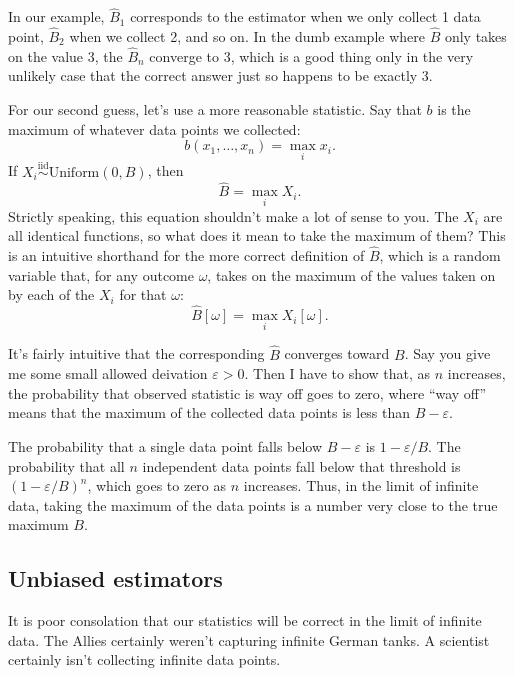 In our example, $\hat{B}_1$ corresponds to the estimator when we only collect
1 data point, $\hat{B}_2$ when we collect 2, and so on. In the dumb example
where $\hat{B}$ only takes on the value 3, the $\hat{B}_n$ converge to 3, which
is a good thing only in the very unlikely case that the correct answer just so
happens to be exactly 3.

For our second guess, let's use a more reasonable statistic. Say that $b$
is the maximum of whatever data points we collected:
\begin{equation*}
    b(x_1, \ldots, x_n) = \max_i x_i.
\end{equation*}
If $X_i \stackrel{\text{iid}}{\sim} \text{Uniform}(0, B)$, then
\begin{equation*}
    \hat{B} = \max_i X_i.
\end{equation*}
Strictly speaking, this equation shouldn't make a lot of sense to you. The $X_i$
are all identical functions, so what does it mean to take the maximum of them?
This is an intuitive shorthand for the more correct definition of $\hat{B}$,
which is a random variable that, for any outcome $\omega$, takes on the maximum of the
values taken on by each of the $X_i$ for that $\omega$:
\begin{equation*}
    \hat{B}[\omega] = \max_i X_i[\omega].
\end{equation*}

It's fairly intuitive that the corresponding $\hat{B}$ converges toward $B$.
Say you give me some small allowed deivation $\varepsilon > 0$. Then I have to
show that, as $n$ increases, the probability that observed statistic is way
off goes to zero, where ``way off'' means that the maximum of the collected
data points is less than $B - \varepsilon$.

The probability that a single data point falls below $B - \varepsilon$ is $1 -
\varepsilon/B$. The probability that all $n$ independent data points fall
below that threshold is $(1 - \varepsilon/B)^n$, which goes to zero as $n$
increases. Thus, in the limit of infinite data, taking the maximum of the data
points is a number very close to the true maximum $B$.

\subsection{Unbiased estimators}

It is poor consolation that our statistics will be correct in the limit of
infinite data. The Allies certainly weren't capturing infinite German tanks.
A scientist certainly isn't collecting infinite data points.

